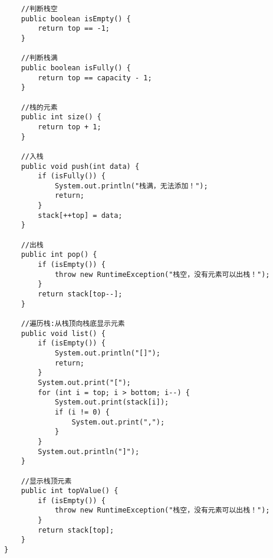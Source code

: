 \documentclass[a4paper]{report}
\begin{document}
\begin{lstlisting}
    //判断栈空
    public boolean isEmpty() {
        return top == -1;
    }

    //判断栈满
    public boolean isFully() {
        return top == capacity - 1;
    }

    //栈的元素
    public int size() {
        return top + 1;
    }

    //入栈
    public void push(int data) {
        if (isFully()) {
            System.out.println("栈满，无法添加！");
            return;
        }
        stack[++top] = data;
    }

    //出栈
    public int pop() {
        if (isEmpty()) {
            throw new RuntimeException("栈空，没有元素可以出栈！");
        }
        return stack[top--];
    }

    //遍历栈:从栈顶向栈底显示元素
    public void list() {
        if (isEmpty()) {
            System.out.println("[]");
            return;
        }
        System.out.print("[");
        for (int i = top; i > bottom; i--) {
            System.out.print(stack[i]);
            if (i != 0) {
                System.out.print(",");
            }
        }
        System.out.println("]");
    }

    //显示栈顶元素
    public int topValue() {
        if (isEmpty()) {
            throw new RuntimeException("栈空，没有元素可以出栈！");
        }
        return stack[top];
    }
}
\end{lstlisting}
\end{document}
